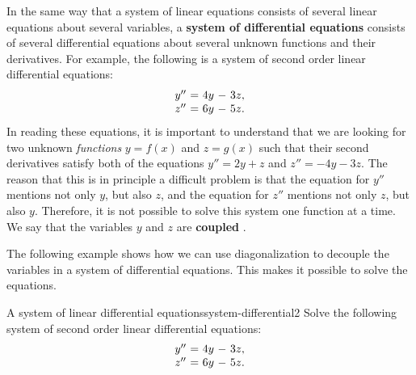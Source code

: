 In the same way that a system of linear equations consists of several
linear equations about several variables, a \textbf{system of
  differential equations}%
%
 consists of several
differential equations about several unknown functions and their
derivatives. For example, the following is a system of second order
linear differential equations:
\begin{equation*}
  \begin{array}{c@{~}c@{~}r@{~}r@{~}r}
    y'' &=& 4y &-& 3z, \\
    z'' &=& 6y &-& 5z. \\
  \end{array}
\end{equation*}
In reading these equations, it is important to understand that we are
looking for two unknown {\em functions} $y=f(x)$ and $z=g(x)$ such
that their second derivatives satisfy both of the equations
$y''=2y+z$ and $z''=-4y-3z$. The reason that this is in principle a
difficult problem is that the equation for $y''$ mentions not only
$y$, but also $z$, and the equation for $z''$ mentions not only $z$,
but also $y$. Therefore, it is not possible to solve this system one
function at a time. We say that the variables $y$ and $z$ are
\textbf{coupled}%
%
.

The following example shows how we can use diagonalization to decouple
the variables in a system of differential equations. This makes it
possible to solve the equations.

\begin{example}{A system of linear differential equations}{system-differential2}
  Solve the following system of second order linear differential equations:
  \begin{equation*}
    \begin{array}{c@{~}c@{~}r@{~}r@{~}r}
      y'' &=& 4y &-& 3z, \\
      z'' &=& 6y &-& 5z. \\
    \end{array}
  \end{equation*}
\end{example}

